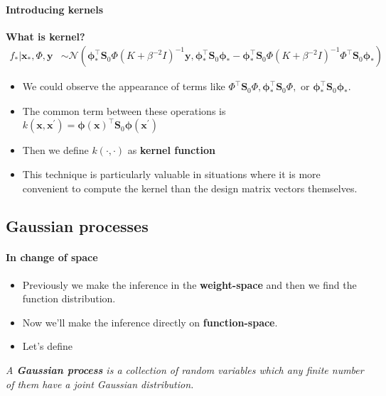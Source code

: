 \begin{frame}{\insertsubsection}
    \framesubtitle{Introducing kernels}

    \textcolor{UniGold}{\textbf{What is kernel?}}
    \begin{equation*}
        \begin{aligned} f_{*} | \mathbf{x}_{*}, \Phi, \mathbf{y} & \sim \mathcal{N}\left(\boldsymbol{\phi}_{*}^{\top} \mathbf{S}_0 \Phi\left(K+\beta^{-2} I\right)^{-1} \mathbf{y}, \boldsymbol{\phi}_{*}^{\top} \mathbf{S}_0 \boldsymbol{\phi}_{*}-\boldsymbol{\phi}_{*}^{\top} \mathbf{S}_0 \Phi\left(K+\beta^{-2} I\right)^{-1} \Phi^{\top} \mathbf{S}_0 \boldsymbol{\phi}_{*}\right)
        \end{aligned}
    \end{equation*}

    \begin{itemize}
        \item We could observe the appearance of terms like $\Phi^{\top} \mathbf{S}_0 \Phi, \boldsymbol{\phi}_{*}^{\top} \mathbf{S}_0 \Phi, \text { or } \boldsymbol{\phi}_{*}^{\top} \mathbf{S}_0 \boldsymbol{\phi}_{*}$.
        \item The common term between these operations is $k(\mathbf{x},\mathbf{x^{\prime}}) = \boldsymbol{\phi}(\mathbf{x})^{\top} \mathbf{S}_0 \boldsymbol{\phi}\left(\mathbf{x}^{\prime}\right)$
        \item Then we define $k(\cdot,\cdot)$ as \textcolor{UniOrange}{\textbf{kernel function}}
        \item This technique is particularly valuable in situations where it is more convenient to compute the kernel than the design matrix vectors themselves.
        
    \end{itemize}
    
\end{frame}

\subsection{Gaussian processes}
\begin{frame}{\insertsubsection}
    \framesubtitle{In change of space}

    \begin{itemize}
        \item Previously we make the inference in the \textcolor{UniOrange}{\textbf{weight-space}} and then we find the function distribution.
        \item Now we'll make the inference directly on \textcolor{UniOrange}{\textbf{function-space}}.
        \item Let's define
    \end{itemize}

    \begin{definition}
        \textit{
        A \textcolor{UniGold}{\textbf{Gaussian process}} is a collection of random variables which any finite number of them have a joint Gaussian distribution.}
    \end{definition}
\end{frame}

